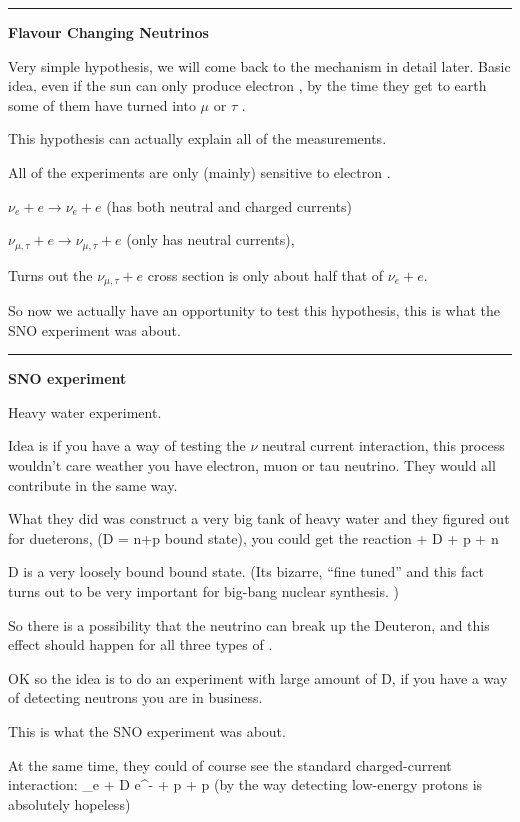 {\noindent\rule{\textwidth}{1pt}

\textbf{Flavour Changing Neutrinos}

Very simple hypothesis, we will come back to the mechanism in detail later. 
Basic idea, even if the sun can only produce electron \nus, by the time they get to earth some of them have turned into $\mu$ or $\tau$ \nus. 


This hypothesis can actually explain all of the measurements.  

All of the experiments are only (mainly) sensitive to electron \nus.

\bc
$\nu_e + e \rightarrow \nu_e + e$  (has both neutral and charged currents) 
\ec

\bc
$\nu_{\mu,\tau} + e \rightarrow \nu_{\mu,\tau} + e$  (only has neutral currents), 
\ec

Turns out the $\nu_{\mu,\tau} + e$ cross section is only about half that of $\nu_e + e$.

So now we actually have an opportunity to test this hypothesis, this is what the SNO experiment was about.

\noindent\rule{\textwidth}{1pt}

\textbf{SNO experiment}

Heavy water experiment.

Idea is if you have a way of testing the $\nu$ neutral current interaction, this process wouldn't care weather you have electron, muon or tau neutrino. 
They would all contribute in the same way. 

What they did was construct a very big tank of heavy water and they figured out for dueterons, (D  = n+p bound state), you could get the reaction
\be
\nu + D \rightarrow \nu + p + n
\ee

D is a very loosely bound bound state. (Its bizarre, ``fine tuned'' and this fact turns out to be very important for big-bang nuclear synthesis. )

So there is a possibility that the neutrino can break up the Deuteron, and this effect should happen for all three types of \nus.

OK so the idea is to do an experiment with large amount of D, if you have a way of detecting neutrons you are in business.

This is what the SNO experiment was about. 

At the same time, they could of course see the standard charged-current interaction:
\be
\nu_e + D \rightarrow e^- + p + p
\ee
(by the way detecting low-energy protons is absolutely hopeless)


}
